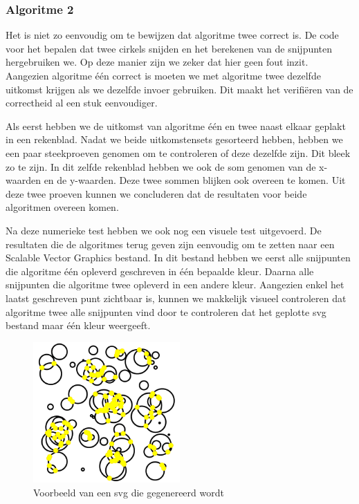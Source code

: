 \documentclass[11pt,a4paper]{article}
\begin{document}
\subsubsection*{Algoritme 2}


Het is niet zo eenvoudig om te bewijzen dat algoritme twee correct is. De code voor het bepalen dat twee cirkels snijden en het berekenen van de snijpunten hergebruiken we. Op deze manier zijn we zeker dat hier geen fout inzit.
Aangezien algoritme \'e\'en correct is moeten we met algoritme twee dezelfde uitkomst krijgen als we dezelfde invoer gebruiken. Dit maakt het verifi\"eren van de correctheid al een stuk eenvoudiger.

Als eerst hebben we de uitkomst van algoritme \'e\'en en twee naast elkaar geplakt in een rekenblad. Nadat we beide uitkomstensets gesorteerd hebben, hebben we een paar steekproeven genomen om te controleren of deze dezelfde zijn. Dit bleek zo te zijn. In dit zelfde rekenblad hebben we ook de som genomen van de x-waarden en de y-waarden. Deze twee sommen blijken ook overeen te komen. Uit deze twee proeven kunnen we concluderen dat de resultaten voor beide algoritmen overeen komen.

Na deze numerieke test hebben we ook nog een visuele test uitgevoerd. De resultaten die de algoritmes terug geven zijn eenvoudig om te zetten naar een Scalable Vector Graphics bestand. In dit bestand hebben we eerst alle snijpunten die algoritme \'e\'en opleverd geschreven in \'e\'en bepaalde kleur. Daarna alle snijpunten die algoritme twee opleverd in een andere kleur. Aangezien enkel het laatst geschreven punt zichtbaar is, kunnen we makkelijk visueel controleren dat algoritme twee alle snijpunten vind door te controleren dat het geplotte svg bestand maar \'e\'en kleur weergeeft.

\begin{figure}[H]
\centering
\includegraphics[width=0.5\textwidth]{vb_svg.png}
\caption*{Voorbeeld van een svg die gegenereerd wordt}
\end{figure}
\end{document}

